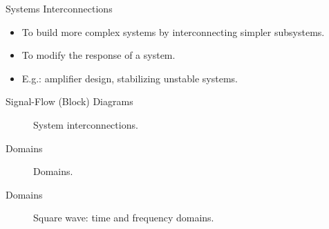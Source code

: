 \begin{frame}{Systems Interconnections}
    \begin{itemize}
      \item To build more complex systems by interconnecting simpler subsystems.
      \item To modify the response of a system.
      \item E.g.: amplifier design, stabilizing unstable systems.
    \end{itemize}
\end{frame}

\begin{frame}[plain]{Signal-Flow (Block) Diagrams}
    \begin{figure}
        \centering
        
        \caption{System interconnections.}\label{fi:sys_interconnections}
    \end{figure}
\end{frame}


\begin{frame}[plain]{Domains}
    \begin{figure}
        \centering
        
        \caption{Domains.}\label{fi:domains}
    \end{figure}
\end{frame}


\begin{frame}[plain]{Domains}
    \begin{figure}
        \centering
        
        \caption{Square wave: time and frequency domains.}\label{fi:square_wave_approx}
    \end{figure}
\end{frame}
